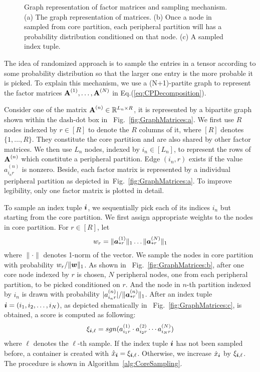 \documentclass[10pt,journal,compsoc]{IEEEtran}
\newcommand{\Sca}[3]{{#1}^{(#2)}_{i_#2#3}}%
\newcommand{\anr}[2]{\Sca{a}{#1}{#2}}
\newcommand{\score}[1]{\xi_{\V{i},#1}}
\newcommand{\V}[1]{{\boldsymbol{{\MakeLowercase{#1}}}}}
\newcommand{\ColVec}[3]{\V{#1}^{(#2)}_{#3}}
\newcommand{\NormColA}[2]{\norm{\ColVec{a}{#1}{*#2}}{1}}
\newcommand{\ColVecA}[1]{\V{a}^{(#1)}_{*r}}
\newcommand{\coord}{(i_1,i_2,\ldots,i_N)}
\newcommand{\WeightR}{\NormColA{1}{r}\ldots\NormColA{N}{r}}
\newcommand{\predx}{\hat{x}_{\V{i}}}
\newcommand{\M}[1]{{\textbf{{\MakeUppercase{#1}}}}}
\newcommand{\FacMat}[2]{\M{#1}^{(#2)}}
\newcommand{\norm}[2]{\|#1\|_{#2}}
\newcommand{\Eqn}[1]{Eq.(\ref{eq:#1})}
\newcommand{\Fig}[1]{Fig.~\ref{fig:#1}}
\newcommand{\Alg}[1]{Algorithm~\ref{alg:#1}}
\begin{document}
\begin{figure*}
	\centering
	\hfil
	\hfil
	\caption{Graph representation of factor matrices and sampling mechanism. (a) The graph representation of matrices. (b) Once a node in sampled from core partition, each peripheral partition will has a probability distribution conditioned on that node. (c) A sampled index tuple.}
	\label{fig:GraphMatrices}
\end{figure*}

The idea of randomized approach is to sample the entries in a tensor according to some probability distribution so that the larger one entry is the more probable it is picked. To explain this mechanism, we use a (N+1)-partite graph to represent the factor matrices $\FacMat{A}{1},\ldots,\FacMat{A}{N}$ in \Eqn{CPDecomposition}. 

Consider one of the matrix $\FacMat{A}{n}\in \mathbb{R}^{L_n \times R}$, it is represented by a bipartite graph shown within the dash-dot box in ~\Fig{GraphMatrices:a}. We first use $R$ nodes indexed by $r\in[R]$ to denote the $R$ columns of it, where $[R]$ denotes $\{1,\ldots,R\}$. They constitute the core partition and are also shared by other factor matrices. We then use $L_n$ nodes, indexed by $i_n\in [L_n]$, to represent the rows of $\FacMat{A}{n}$ which constitute a peripheral partition. Edge $(i_n,r)$ exists if the value $\anr{n}{r}$ is nonzero. Beside, each factor matrix is represented by a individual peripheral partition as depicted in~\Fig{GraphMatrices:a}. To improve legibility, only one factor matrix is plotted in detail.

To sample an index tuple $\V{i}$, we sequentially pick each of its indices $i_n$ but starting from the core partition. We first assign appropriate weights to the nodes in core partition. For $r\in[R]$, let
\begin{equation}
w_r = \WeightR
\end{equation}
where $\|\cdot\|$ denotes 1-norm of the vector. We sample the nodes in core partition with probability $w_r/\norm{\V{W}}{1}$. As shown in ~\Fig{GraphMatrices:b}, after one core node indexed by $r$ is chosen, $N$ peripheral nodes, one from each peripheral partition, to be picked conditioned on $r$. And the node in $n$-th partition indexed by $i_n$ is drawn with probability $|\anr{n}{r}|/\norm{\ColVecA{n}}{1}$. After an index tuple $\V{i}=\coord$, as depicted shematically in ~\Fig{GraphMatrices:c}, is obtained, a score is computed as following:
\begin{equation}
\score{\ell}  = sgn(\anr{1}{r}\cdot\anr{2}{r}\cdots\anr{N}{r})
\end{equation}
where $\ell$ denotes the $\ell$-th sample. If the index tuple $\V{i}$ has not been sampled before, a container is created with $\predx = \score{\ell}$. Otherwise, we increase $\predx$ by $\score{\ell}$. The procedure is shown in \Alg{CoreSampling}.
\end{document}
